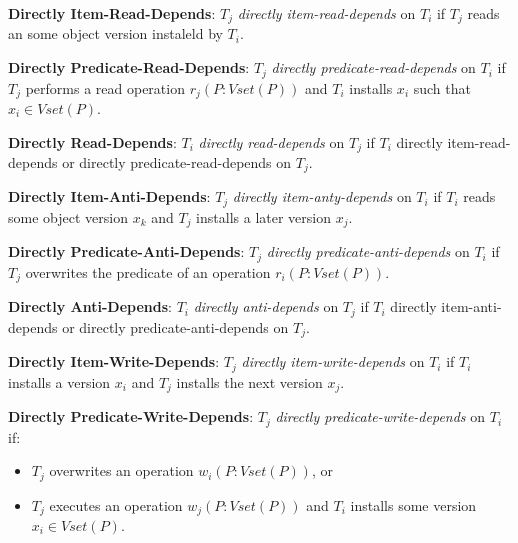 \begin{definition}
    \textbf{Directly Item-Read-Depends}: $T_j$ \textit{directly item-read-depends} on $T_i$ if $T_j$ reads an some object version instaleld by $T_i$.
\end{definition}

\begin{definition}
    \textbf{Directly Predicate-Read-Depends}: $T_j$ \textit{directly predicate-read-depends} on $T_i$ if $T_j$ performs a read operation $r_j(P: Vset(P))$ and $T_i$ installs $x_i$ such that $x_i \in Vset(P)$.
\end{definition}

\begin{definition}
    \textbf{Directly Read-Depends}: $T_i$ \textit{directly read-depends} on $T_j$ if $T_i$ directly item-read-depends or directly predicate-read-depends on $T_j$.
\end{definition}

\begin{definition}
    \textbf{Directly Item-Anti-Depends}: $T_j$ \textit{directly item-anty-depends} on $T_i$ if $T_i$ reads some object version $x_k$ and $T_j$ installs a later version $x_j$.
\end{definition}

\begin{definition}
    \textbf{Directly Predicate-Anti-Depends}: $T_j$ \textit{directly predicate-anti-depends} on $T_i$ if $T_j$ overwrites the predicate of an operation $r_i(P: Vset(P))$. %
\end{definition}

\begin{definition}
    \textbf{Directly Anti-Depends}: $T_i$ \textit{directly anti-depends} on $T_j$ if $T_i$ directly item-anti-depends or directly predicate-anti-depends on $T_j$.
\end{definition}

\begin{definition}
    \textbf{Directly Item-Write-Depends}: $T_j$ \textit{directly item-write-depends} on $T_i$ if $T_i$ installs a version $x_i$ and $T_j$ installs the next version $x_j$.
\end{definition}

\begin{definition}
    \textbf{Directly Predicate-Write-Depends}: $T_j$ \textit{directly predicate-write-depends} on $T_i$ if:
    \begin{itemize}
        \item $T_j$ overwrites an operation $w_i(P: Vset(P))$, or
        \item $T_j$ executes an operation $w_j(P: Vset(P))$ and $T_i$ installs some version $x_i \in Vset(P)$.
    \end{itemize}
\end{definition}

